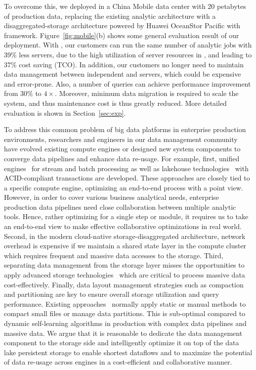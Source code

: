 To overcome this, we deployed \sys in a China Mobile data center with 20 petabytes of production data, replacing the existing analytic architecture with a disaggregated-storage architecture powered by Huawei OceanStor Pacific with  \sys framework.
 Figure~\ref{fig:mobile}(b) shows some general evaluation result of our deployment. With \sys, our customers can  run the same number of analytic jobs with 39\% less servers, due to the high utilization of   server resources in \sys, and leading to 37\% cost saving (TCO).   In addition, our customers no longer need to maintain data management between independent \kafka and \hdfs servers, which could be expensive and error-prone. 
 Also, a number of  queries can achieve performance improvement from  30\% to $4\times$.
Moreover, minimum data migration is required to scale the system, and thus maintenance cost is thus greatly reduced.
 More detailed evaluation is shown in Section~\ref{sec:exp}.


 
 
 
 \iffalse

To address this common problem of big data platforms in enterprise production environments, researchers and engineers in our data management community have evolved existing compute engines or designed new system components to converge data pipelines and enhance data re-usage. For example, first, unified engines~\cite{} for stream and batch processing as well as lakehouse technologies~\cite{} with ACID-compliant transactions are developed. These approaches are closely tied to a specific compute engine, optimizing an end-to-end process with a point view. However, in order to cover various business analytical needs, enterprise production data pipelines need close collaboration between multiple analytic tools. Hence, rather optimizing for a single step or module, it requires us to take an end-to-end view to make effective collaborative optimizations in real world. Second, in the modern cloud-native storage-disaggregated architecture, network overhead is expensive if we maintain a shared state layer in the compute cluster which requires frequent and massive data accesses to the storage. Third, separating data management from the storage layer misses the opportunities to apply advanced storage technologies~\cite{} which are critical to process massive data cost-effectively. Finally, data layout management strategies such as compaction and partitioning are key to ensure overall storage utilization and query performance. Existing approaches~\cite{} normally apply static or manual methods to compact small files or manage data partitions. This is sub-optimal compared to dynamic self-learning algorithms in production with complex data pipelines and massive data. We argue that it is reasonable to dedicate the data management component to the storage side and intelligently optimize it on top of the data lake persistent storage to enable shortest dataflows and to maximize the potential of data re-usage across engines in a cost-efficient and collaborative manner.


